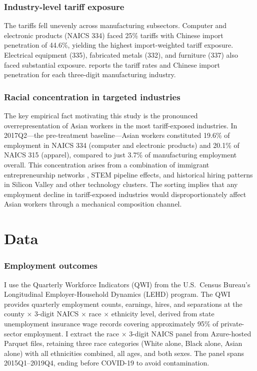 \documentclass[12pt]{article}
\begin{document}
\subsubsection*{Industry-level tariff exposure} The tariffs fell unevenly across manufacturing subsectors. Computer and electronic products (NAICS 334) faced 25\% tariffs with Chinese import penetration of 44.6\%, yielding the highest import-weighted tariff exposure. Electrical equipment (335), fabricated metals (332), and furniture (337) also faced substantial exposure.  reports the tariff rates and Chinese import penetration for each three-digit manufacturing industry.

\subsubsection*{Racial concentration in targeted industries} The key empirical fact motivating this study is the pronounced overrepresentation of Asian workers in the most tariff-exposed industries. In 2017Q2---the pre-treatment baseline---Asian workers constituted 19.6\% of employment in NAICS 334 (computer and electronic products) and 20.1\% of NAICS 315 (apparel), compared to just 3.7\% of manufacturing employment overall. This concentration arises from a combination of immigrant entrepreneurship networks \citep{kerr2015ethnic}, STEM pipeline effects, and historical hiring patterns in Silicon Valley and other technology clusters. The sorting implies that any employment decline in tariff-exposed industries would disproportionately affect Asian workers through a mechanical composition channel.


\section{Data}\label{sec:data}

\subsubsection*{Employment outcomes} I use the Quarterly Workforce Indicators (QWI) from the U.S.\ Census Bureau's Longitudinal Employer-Household Dynamics (LEHD) program. The QWI provides quarterly employment counts, earnings, hires, and separations at the county $\times$ 3-digit NAICS $\times$ race $\times$ ethnicity level, derived from state unemployment insurance wage records covering approximately 95\% of private-sector employment. I extract the race $\times$ 3-digit NAICS panel from Azure-hosted Parquet files, retaining three race categories (White alone, Black alone, Asian alone) with all ethnicities combined, all ages, and both sexes. The panel spans 2015Q1--2019Q4, ending before COVID-19 to avoid contamination.
\end{document}
